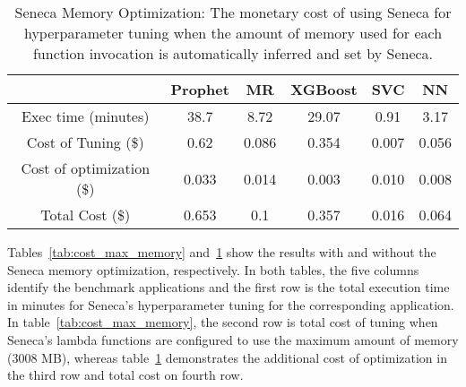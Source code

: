 \begin{table}
\centering
\begin{tabular}{|c|c|c|c|c|c|}
\hline
& Prophet & MR & XGBoost & SVC & NN\\
\hline
\hline
Exec time (minutes)& 38.7 & 8.72 & 29.07 & 0.91 & 3.17 \\
\hline
Cost of Tuning (\$) &0.62 & 0.086 & 0.354 & 0.007 & 0.056 \\
\hline
Cost of optimization (\$) &0.033 & 0.014 & 0.003 & 0.010 & 0.008 \\
\hline
Total Cost (\$) &0.653 & 0.1 & 0.357 & 0.016 & 0.064 \\
\hline
\end{tabular}
\caption{ Seneca  Memory  Optimization:  The  monetary  cost  of using Seneca for hyperparameter tuning when the amount of memory  used  for  each  function  invocation  is  automatically inferred and set by Seneca.
\label{tab:cost_optimized}}
\vspace{-0.2in}
\end{table}

Tables~\ref{tab:cost_max_memory} and~\ref{tab:cost_optimized} show the results with and without 
the Seneca memory optimization, respectively. In both tables, the five columns identify the 
benchmark applications and the first row is the total execution time in minutes for 
Seneca's hyperparameter tuning for the corresponding application.  
In table~\ref{tab:cost_max_memory}, the second row is total cost of tuning when Seneca's 
lambda functions are configured to use the maximum amount of memory (3008 MB), whereas table~\ref{tab:cost_optimized} demonstrates the additional cost of optimization in the third row 
and total cost on fourth row.






